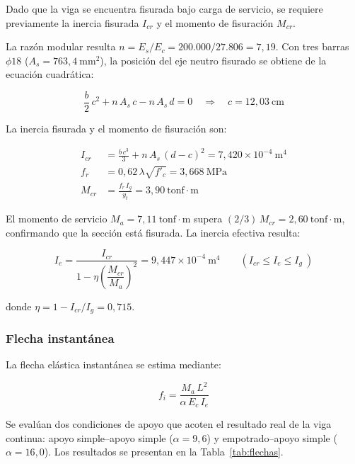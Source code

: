 Dado que la viga se encuentra fisurada bajo carga de servicio, se requiere previamente la inercia fisurada $I_{cr}$ y el momento de fisuración $M_{cr}$.
 
La razón modular resulta $n = E_s/E_c = 200{.}000/27{.}806 = 7{,}19$. Con tres barras $\phi 18$ ($A_s = 763{,}4\ \text{mm}^2$), la posición del eje neutro fisurado se obtiene de la ecuación cuadrática:
 
\begin{equation}
    \frac{b}{2}\,c^2 + n\,A_s\,c - n\,A_s\,d = 0 \quad \Rightarrow \quad c = 12{,}03\ \text{cm}
\end{equation}
 
La inercia fisurada y el momento de fisuración son:
 
\begin{align}
    I_{cr} &= \frac{b\,c^3}{3} + n\,A_s\,(d-c)^2 = 7{,}420 \times 10^{-4}\ \text{m}^4 \\
    f_r &= 0{,}62\,\lambda\sqrt{f'_c} = 3{,}668\ \text{MPa} \\
    M_{cr} &= \frac{f_r\,I_g}{y_t} = 3{,}90\ \text{tonf}{\cdot}\text{m}
\end{align}
 
El momento de servicio $M_a = 7{,}11\ \text{tonf}{\cdot}\text{m}$ supera $(2/3)\,M_{cr} = 2{,}60\ \text{tonf}{\cdot}\text{m}$, confirmando que la sección está fisurada. La inercia efectiva resulta:
 
\begin{equation}
    I_e = \frac{I_{cr}}{1 - \eta\left(\dfrac{M_{cr}}{M_a}\right)^2} = 9{,}447 \times 10^{-4}\ \text{m}^4 \qquad \left(I_{cr} \leq I_e \leq I_g\ \right)
\end{equation}
 
donde $\eta = 1 - I_{cr}/I_g = 0{,}715$.
 
\subsubsection{Flecha instantánea}
 
La flecha elástica instantánea se estima mediante:
 
\begin{equation}
    f_i = \frac{M_a\,L^2}{\alpha\,E_c\,I_e}
\end{equation}
 
Se evalúan dos condiciones de apoyo que acoten el resultado real de la viga continua: apoyo simple--apoyo simple ($\alpha = 9{,}6$) y empotrado--apoyo simple ($\alpha = 16{,}0$). Los resultados se presentan en la Tabla~\ref{tab:flechas}.
 
